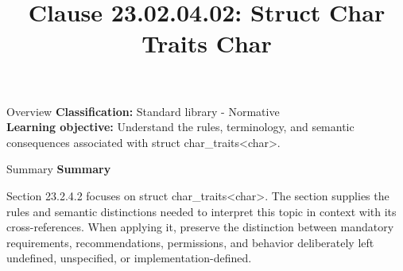 \documentclass[10pt,letterpaper]{article}
\title{Clause 23.02.04.02: Struct Char Traits Char}
\author{}
\date{}
\begin{document}
\maketitle
\begin{CornellOverviewBox}{Overview}
\textbf{Classification:} Standard library - Normative\\[2pt]
\textbf{Learning objective:} Understand the rules, terminology, and semantic consequences associated with struct char\_traits<char>.
\end{CornellOverviewBox}\begin{CornellSummaryBox}{Summary}
{\sffamily\bfseries\color{Accent} Summary}\par\vspace{3pt}Section 23.2.4.2 focuses on struct char\_traits<char>. The section supplies the rules and semantic distinctions needed to interpret this topic in context with its cross-references. When applying it, preserve the distinction between mandatory requirements, recommendations, permissions, and behavior deliberately left undefined, unspecified, or implementation-defined.
\end{CornellSummaryBox}
\end{document}
